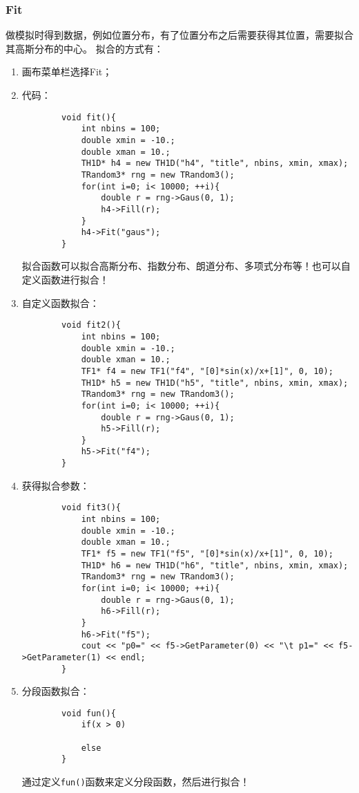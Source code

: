 \documentclass{article}
\begin{document}
\subsubsection{Fit}
做模拟时得到数据，例如位置分布，有了位置分布之后需要获得其位置，需要拟合其高斯分布的中心。
\newline
拟合的方式有：
\begin{enumerate}
    \item 画布菜单栏选择Fit；
    \item 代码：
          \begin{lstlisting}
        void fit(){
            int nbins = 100;
            double xmin = -10.;
            double xman = 10.;
            TH1D* h4 = new TH1D("h4", "title", nbins, xmin, xmax);
            TRandom3* rng = new TRandom3();
            for(int i=0; i< 10000; ++i){
                double r = rng->Gaus(0, 1);
                h4->Fill(r);
            }
            h4->Fit("gaus");
        }
    \end{lstlisting}
          拟合函数可以拟合高斯分布、指数分布、朗道分布、多项式分布等！也可以自定义函数进行拟合！
    \item 自定义函数拟合：
          \begin{lstlisting}
        void fit2(){
            int nbins = 100;
            double xmin = -10.;
            double xman = 10.;
            TF1* f4 = new TF1("f4", "[0]*sin(x)/x+[1]", 0, 10);
            TH1D* h5 = new TH1D("h5", "title", nbins, xmin, xmax);
            TRandom3* rng = new TRandom3();
            for(int i=0; i< 10000; ++i){
                double r = rng->Gaus(0, 1);
                h5->Fill(r);
            }
            h5->Fit("f4");
        }
    \end{lstlisting}
    \item 获得拟合参数：
          \begin{lstlisting}
        void fit3(){
            int nbins = 100;
            double xmin = -10.;
            double xman = 10.;
            TF1* f5 = new TF1("f5", "[0]*sin(x)/x+[1]", 0, 10);
            TH1D* h6 = new TH1D("h6", "title", nbins, xmin, xmax);
            TRandom3* rng = new TRandom3();
            for(int i=0; i< 10000; ++i){
                double r = rng->Gaus(0, 1);
                h6->Fill(r);
            }
            h6->Fit("f5");
            cout << "p0=" << f5->GetParameter(0) << "\t p1=" << f5->GetParameter(1) << endl;
        }
    \end{lstlisting}
    \item 分段函数拟合：
          \begin{lstlisting}
        void fun(){
            if(x > 0)
            
            else
        }
    \end{lstlisting}
          通过定义\texttt{fun()}函数来定义分段函数，然后进行拟合！
\end{enumerate}
\end{document}
